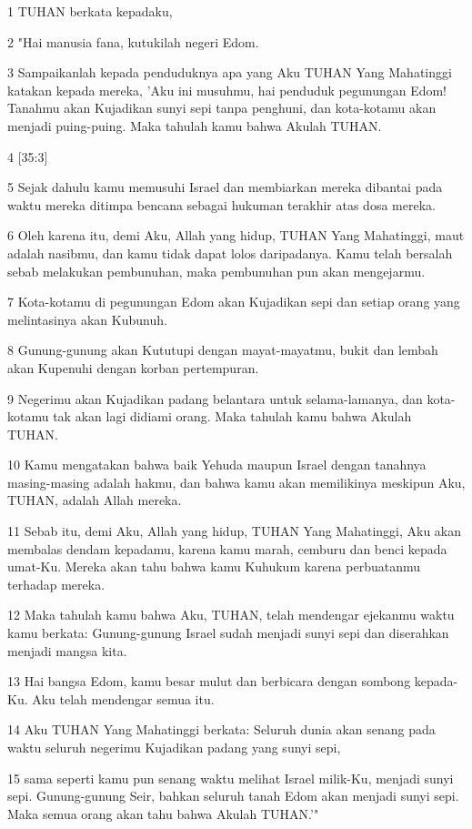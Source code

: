 \par 1 TUHAN berkata kepadaku,
\par 2 "Hai manusia fana, kutukilah negeri Edom.
\par 3 Sampaikanlah kepada penduduknya apa yang Aku TUHAN Yang Mahatinggi katakan kepada mereka, 'Aku ini musuhmu, hai penduduk pegunungan Edom! Tanahmu akan Kujadikan sunyi sepi tanpa penghuni, dan kota-kotamu akan menjadi puing-puing. Maka tahulah kamu bahwa Akulah TUHAN.
\par 4 [35:3]
\par 5 Sejak dahulu kamu memusuhi Israel dan membiarkan mereka dibantai pada waktu mereka ditimpa bencana sebagai hukuman terakhir atas dosa mereka.
\par 6 Oleh karena itu, demi Aku, Allah yang hidup, TUHAN Yang Mahatinggi, maut adalah nasibmu, dan kamu tidak dapat lolos daripadanya. Kamu telah bersalah sebab melakukan pembunuhan, maka pembunuhan pun akan mengejarmu.
\par 7 Kota-kotamu di pegunungan Edom akan Kujadikan sepi dan setiap orang yang melintasinya akan Kubunuh.
\par 8 Gunung-gunung akan Kututupi dengan mayat-mayatmu, bukit dan lembah akan Kupenuhi dengan korban pertempuran.
\par 9 Negerimu akan Kujadikan padang belantara untuk selama-lamanya, dan kota-kotamu tak akan lagi didiami orang. Maka tahulah kamu bahwa Akulah TUHAN.
\par 10 Kamu mengatakan bahwa baik Yehuda maupun Israel dengan tanahnya masing-masing adalah hakmu, dan bahwa kamu akan memilikinya meskipun Aku, TUHAN, adalah Allah mereka.
\par 11 Sebab itu, demi Aku, Allah yang hidup, TUHAN Yang Mahatinggi, Aku akan membalas dendam kepadamu, karena kamu marah, cemburu dan benci kepada umat-Ku. Mereka akan tahu bahwa kamu Kuhukum karena perbuatanmu terhadap mereka.
\par 12 Maka tahulah kamu bahwa Aku, TUHAN, telah mendengar ejekanmu waktu kamu berkata: Gunung-gunung Israel sudah menjadi sunyi sepi dan diserahkan menjadi mangsa kita.
\par 13 Hai bangsa Edom, kamu besar mulut dan berbicara dengan sombong kepada-Ku. Aku telah mendengar semua itu.
\par 14 Aku TUHAN Yang Mahatinggi berkata: Seluruh dunia akan senang pada waktu seluruh negerimu Kujadikan padang yang sunyi sepi,
\par 15 sama seperti kamu pun senang waktu melihat Israel milik-Ku, menjadi sunyi sepi. Gunung-gunung Seir, bahkan seluruh tanah Edom akan menjadi sunyi sepi. Maka semua orang akan tahu bahwa Akulah TUHAN.'"

